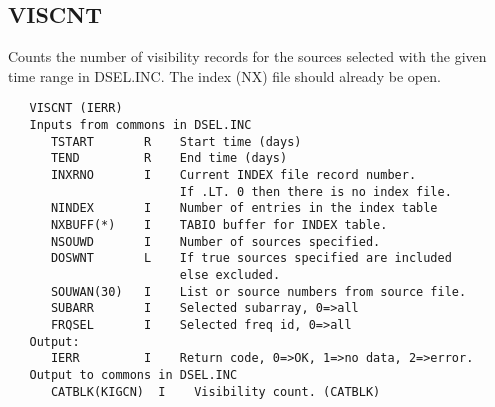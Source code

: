 \subsection{VISCNT}
Counts the number of visibility records for the sources selected
with the given time range in DSEL.INC.
The index (NX) file should already be open.
\begin{verbatim}
   VISCNT (IERR)
   Inputs from commons in DSEL.INC
      TSTART       R    Start time (days)
      TEND         R    End time (days)
      INXRNO       I    Current INDEX file record number.
                        If .LT. 0 then there is no index file.
      NINDEX       I    Number of entries in the index table
      NXBUFF(*)    I    TABIO buffer for INDEX table.
      NSOUWD       I    Number of sources specified.
      DOSWNT       L    If true sources specified are included
                        else excluded.
      SOUWAN(30)   I    List or source numbers from source file.
      SUBARR       I    Selected subarray, 0=>all
      FRQSEL       I    Selected freq id, 0=>all
   Output:
      IERR         I    Return code, 0=>OK, 1=>no data, 2=>error.
   Output to commons in DSEL.INC
      CATBLK(KIGCN)  I    Visibility count. (CATBLK)
\end{verbatim}

\newpage

